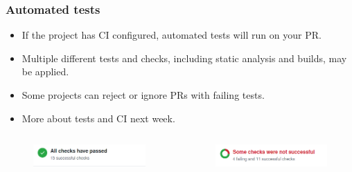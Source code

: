 \documentclass[aspectratio=169]{beamer}              %
\begin{document}
\begin{frame}
	\frametitle{Automated tests}
	
\begin{block}{}
		\begin{itemize}
			\item If the project has CI configured, automated tests will run on your PR.
			\item Multiple different tests and checks, including static analysis and builds, may be applied.
			\item Some projects can reject or ignore PRs with failing tests.
			\item More about tests and CI next week.
		\end{itemize}
	\end{block}
	
\begin{columns}

\begin{column}{0.4\textwidth}
\begin{figure}[ht!]
	\begin{center}
  	  \includegraphics[width=\textwidth]{img/gh-ci-success.png}
	\end{center}
\end{figure}
\end{column}

\begin{column}{0.4\textwidth}
\begin{figure}[ht!]
	\begin{center}
  	  \includegraphics[width=\textwidth]{img/gh-ci-fail.png}
	\end{center}
\end{figure}
\end{column}
\end{columns}

\end{frame}
\end{document}
